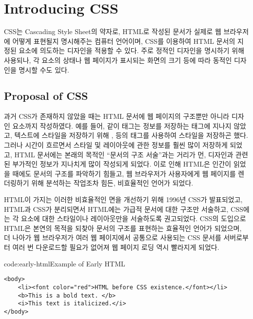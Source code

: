 \section{Introducing CSS}\label{sect:introducing-css}

CSS는 Cascading Style Sheet의 약자로, HTML로 작성된 문서가 실제로 웹 브라우저에 어떻게 표현될지 명시해주는 컴퓨터 언어이며, CSS를 이용하여 HTML 문서의 지정된 요소에 의도하는 디자인을 적용할 수 있다. 주로 정적인 디자인을 명시하기 위해 사용되나, 각 요소의 상태나 웹 페이지가 표시되는 화면의 크기 등에 따라 동적인 디자인을 명시할 수도 있다.

\subsection*{Proposal of CSS}

과거 CSS가 존재하지 않았을 때는 HTML 문서에 웹 페이지의 구조뿐만 아니라 디자인 요소까지 작성하였다. 예를 들어, \과 같이  태그는 정보를 저장하는 태그에 지나지 않았고, 텍스트에 스타일을 저장하기 위해 ,  등의 태그를 사용하여 스타일을 저장하곤 했다. 그러나 시간이 흐르면서 스타일 및 레이아웃에 관한 정보를 훨씬 많이 저장하게 되었고, HTML 문서에는 본래의 목적인 ``문서의 구조 서술''과는 거리가 먼, 디자인과 관련된 부가적인 정보가 지나치게 많이 작성되게 되었다. 이로 인해 HTML은 인간이 읽었을 때에도 문서의 구조를 파악하기 힘들고, 웹 브라우저가 사용자에게 웹 페이지를 렌더링하기 위해 분석하는 작업조차 힘든, 비효율적인 언어가 되었다.

HTML이 가지는 이러한 비효율적인 면을 개선하기 위해 1996년 CSS가 발표되었고, HTML과 CSS가 분리되면서 HTML에는 가급적 문서에 대한 구조만 서술하고, CSS에는 각 요소에 대한 스타일이나 레이아웃만을 서술하도록 권고되었다. CSS의 도입으로 HTML은 본연의 목적을 되찾아 문서의 구조를 표현하는 효율적인 언어가 되었으며, 더 나아가 웹 브라우저가 여러 웹 페이지에서 공통으로 사용되는 CSS 문서를 서버로부터 여러 번 다운로드할 필요가 없어져 웹 페이지 로딩 역시 빨라지게 되었다.

\begin{codeenv}{code:early-html}{Example of Early HTML}\begin{verbatim}
<body>
    <li><font color="red">HTML before CSS existence.</font></li>
    <b>This is a bold text. </b>
    <i>This text is italicized.</i>
</body>
\end{verbatim}
\end{codeenv}
